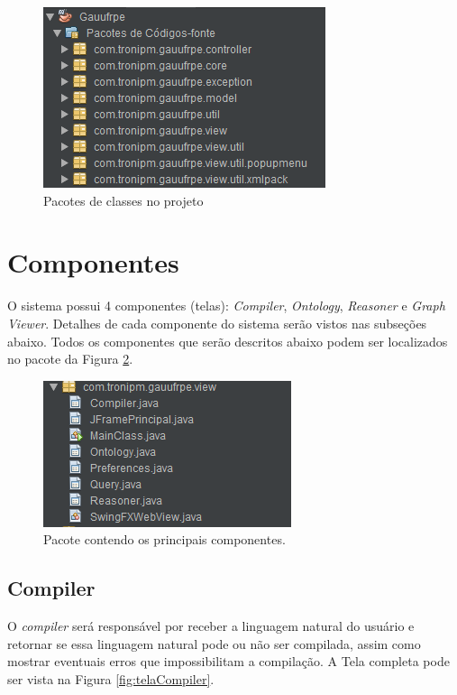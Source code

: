 \documentclass{bcc}
\begin{document}
\begin{figure}[H]
\centering
\includegraphics[width=.6\textwidth]{Figuras/estrutura.png}
\caption{Pacotes de classes no projeto}
\label{fig:pacotesJava}
\end{figure}

\section{Componentes}
O sistema possui 4 componentes (telas): \textit{Compiler}, \textit{Ontology}, \textit{Reasoner} e \textit{Graph Viewer}. Detalhes de cada componente do sistema serão vistos nas subseções abaixo. Todos os componentes que serão descritos abaixo podem ser localizados no pacote da Figura \ref{fig:pacotesView}. 

\begin{figure}[H]
\centering
\includegraphics[width=.6\textwidth]{Figuras/pacote_view.png}
\caption{Pacote contendo os principais componentes.}
\label{fig:pacotesView}
\end{figure}

\subsection{Compiler}

O \textit{compiler} será responsável por receber a linguagem natural do usuário e retornar se essa linguagem natural pode ou não ser compilada, assim como mostrar eventuais erros que impossibilitam a compilação. A Tela completa pode ser vista na Figura \ref{fig:telaCompiler}.
\end{document}
